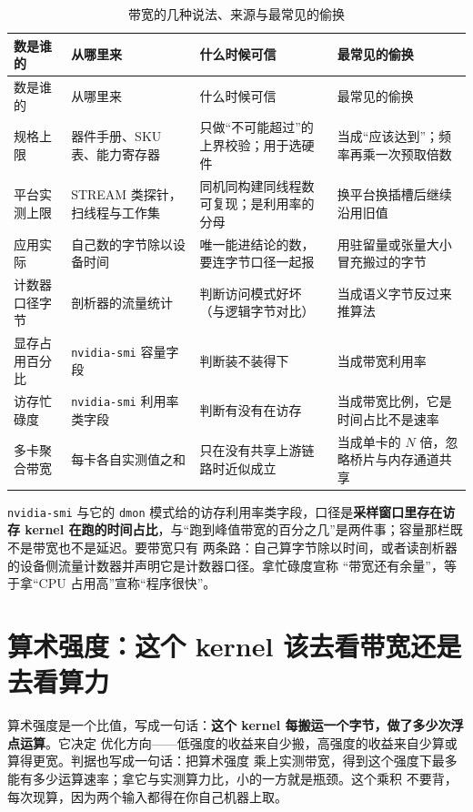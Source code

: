 \documentclass[12pt,a4paper,fontset=fandol]{ctexbook}
\newcommand{\Tp}[1]{\texttt{#1}}
\begin{document}
\begin{longtable}{>{\raggedright\arraybackslash}p{} >{\raggedright\arraybackslash}p{} >{\raggedright\arraybackslash}p{} >{\raggedright\arraybackslash}p{}}
\caption{带宽的几种说法、来源与最常见的偷换}\label{tab:pm12-caliber}\\
\toprule
数是谁的 & 从哪里来 & 什么时候可信 & 最常见的偷换 \\
\midrule
\endfirsthead
\toprule
数是谁的 & 从哪里来 & 什么时候可信 & 最常见的偷换 \\
\midrule
\endhead
\midrule
\bottomrule
\endlastfoot
规格上限 & 器件手册、SKU 表、能力寄存器 & 只做``不可能超过''的上界校验；用于选硬件 & 当成``应该达到''；频率再乘一次预取倍数 \\
平台实测上限 & STREAM 类探针，扫线程与工作集 & 同机同构建同线程数可复现；是利用率的分母 & 换平台换插槽后继续沿用旧值 \\
应用实际 & 自己数的字节除以设备时间 & 唯一能进结论的数，要连字节口径一起报 & 用驻留量或张量大小冒充搬过的字节 \\
计数器口径字节 & 剖析器的流量统计 & 判断访问模式好坏（与逻辑字节对比） & 当成语义字节反过来推算法 \\
显存占用百分比 & \Tp{nvidia-smi} 容量字段 & 判断装不装得下 & 当成带宽利用率 \\
访存忙碌度 & \Tp{nvidia-smi} 利用率类字段 & 判断有没有在访存 & 当成带宽比例，它是时间占比不是速率 \\
多卡聚合带宽 & 每卡各自实测值之和 & 只在没有共享上游链路时近似成立 & 当成单卡的 $N$ 倍，忽略桥片与内存通道共享 \\
\end{longtable}

\begin{warning}[title={把``利用率''当带宽}]
\Tp{nvidia-smi} 与它的 \Tp{dmon} 模式给的访存利用率类字段，口径是\textbf{采样窗口里存在访存 kernel
在跑的时间占比}，与``跑到峰值带宽的百分之几''是两件事；容量那栏既不是带宽也不是延迟。要带宽只有
两条路：自己算字节除以时间，或者读剖析器的设备侧流量计数器并声明它是计数器口径。拿忙碌度宣称
``带宽还有余量''，等于拿``CPU 占用高''宣称``程序很快''。
\end{warning}

\section{算术强度：这个 kernel 该去看带宽还是去看算力}
\label{sec:pm12-intensity}

算术强度是一个比值，写成一句话：\textbf{这个 kernel 每搬运一个字节，做了多少次浮点运算}。它决定
优化方向——低强度的收益来自少搬，高强度的收益来自少算或算得更宽。判据也写成一句话：把算术强度
乘上实测带宽，得到这个强度下最多能有多少运算速率；拿它与实测算力比，小的一方就是瓶颈。这个乘积
不要背，每次现算，因为两个输入都得在你自己机器上取。
\end{document}
